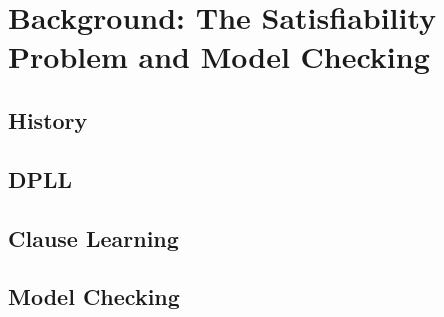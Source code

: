 \chapter{Background: The Satisfiability Problem and Model Checking}
\section{History}

\section{DPLL}

\section{Clause Learning}

\section{Model Checking}